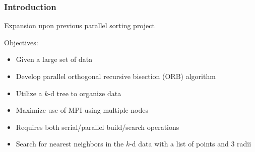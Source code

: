 \documentclass[usernames,dvipsnames]{beamer}
\begin{document}
\begin{frame}	
    \frametitle{Introduction}
    	
    	Expansion upon previous parallel sorting project
    	
    	\vspace{10pt}
    	
    	\begin{block}{Objectives:}
    		\begin{itemize}
    			\item Given a large set of data
    			\item Develop parallel orthogonal recursive bisection (ORB) algorithm
    			\item Utilize a $k$-d tree to organize data
    			\item Maximize use of MPI using multiple nodes
    			\item Requires both serial/parallel build/search operations
    			\item Search for nearest neighbors in the $k$-d data with a list of points and 3 radii
    		\end{itemize}
    	\end{block}
\end{frame}
\end{document}
